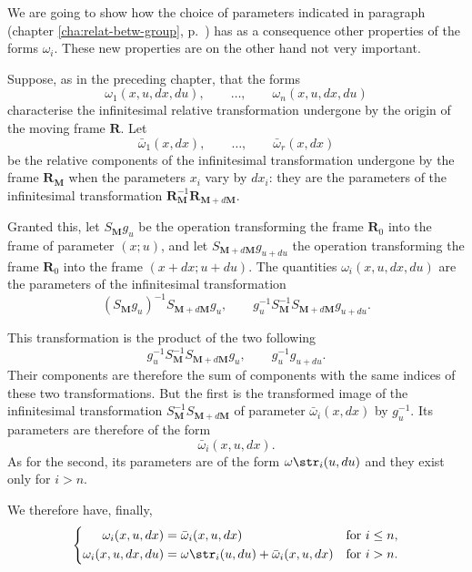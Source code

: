 {\small
We are going to show how the choice of parameters indicated in paragraph  (chapter \ref{cha:relat-betw-group}, p.~\pageref{sec:101}) has as a consequence other properties of the forms $\omega_{i}$. These new properties are on the other hand not very important.

Suppose, as in the preceding chapter, that the forms
\[
\omega_{1}(x,u,dx,du),\qquad\dots,\qquad\omega_{n}(x,u,dx,du)
\]
characterise the infinitesimal relative transformation undergone by the origin of the moving frame $\mathbf{R}$. Let 
\[
\bar\omega_{1}(x,dx),\qquad\dots,\qquad\bar\omega_{r}(x,dx)
\]
be the relative components of the infinitesimal transformation undergone by the frame $\mathbf{R}_{\mathbf{M}}$ when the parameters $x_{i}$ vary by $dx_{i}$: they are the parameters of the infinitesimal transformation $\mathbf{R}^{-1}_{\mathbf{M}}\mathbf{R}_{\mathbf{M}+d\mathbf{M}}$.

Granted this, let $S_{\mathbf{M}}g_{u}$ be the operation transforming the frame $\mathbf{R}_{0}$ into the frame of parameter $(x;u)$, and let $S_{\mathbf{M}+d\mathbf{M}}g_{u+du}$ the operation transforming the frame $\mathbf{R}_{0}$ into the frame $(x+dx;u+du)$. The quantities $\omega_{i}(x,u,dx,du)$ are the parameters of the infinitesimal transformation
\[
(S_{\mathbf{M}}g_{u})^{-1}S_{\mathbf{M}+d\mathbf{M}}g_{u},\qquad g^{-1}_{u}S^{-1}_{\mathbf{M}}S_{\mathbf{M}+d\mathbf{M}}g_{u+du}.
\]

This transformation is the product of the two following
\[
g^{-1}_{u}S_{\mathbf{M}}^{-1}S_{\mathbf{M}+d\mathbf{M}}g_{u},\qquad g_{u}^{-1}g_{u+du}.
\]
Their components are therefore the sum of components with the same indices of these two transformations. But the first is the transformed image of the infinitesimal transformation $S_{\mathbf{M}}^{-1}S_{\mathbf{M}+d\mathbf{M}}$ of parameter $\bar\omega_{i}(x,dx)$ by $g_{u}^{-1}$. Its parameters are therefore of the form
\[
\bar\omega_{i}(x,u,dx).
\]
As for the second, its parameters are of the form $\omega\str_{i}(u,du)$ and they exist only for $i>n$.

We therefore have, finally,
\begin{equation}
  \label{eq:8.11}
  \left\{
    \begin{aligned}
      \omega_{i}(x,u,dx)&=\bar\omega_{i}(x,u,dx)&\text{for }&i\le n,\\
      \omega_{i}(x,u,dx,du)&=\omega\str_{i}(u,du)+\bar\omega_{i}(x,u,dx)&\text{for }&i> n.
    \end{aligned}
  \right.
\end{equation}

}
